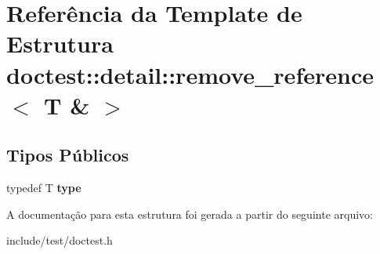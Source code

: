 \hypertarget{structdoctest_1_1detail_1_1remove__reference_3_01T_01_6_01_4}{}\section{Referência da Template de Estrutura doctest\+:\+:detail\+:\+:remove\+\_\+reference$<$ T \& $>$}
\label{structdoctest_1_1detail_1_1remove__reference_3_01T_01_6_01_4}
\subsection*{Tipos Públicos}
\begin{DoxyCompactItemize}
\item 
\mbox{\label{structdoctest_1_1detail_1_1remove__reference_3_01T_01_6_01_4_a37201537c0190f14f504d9f507bc042a}} 
typedef T {\bfseries type}
\end{DoxyCompactItemize}


A documentação para esta estrutura foi gerada a partir do seguinte arquivo\+:\begin{DoxyCompactItemize}
\item 
include/test/doctest.\+h\end{DoxyCompactItemize}
